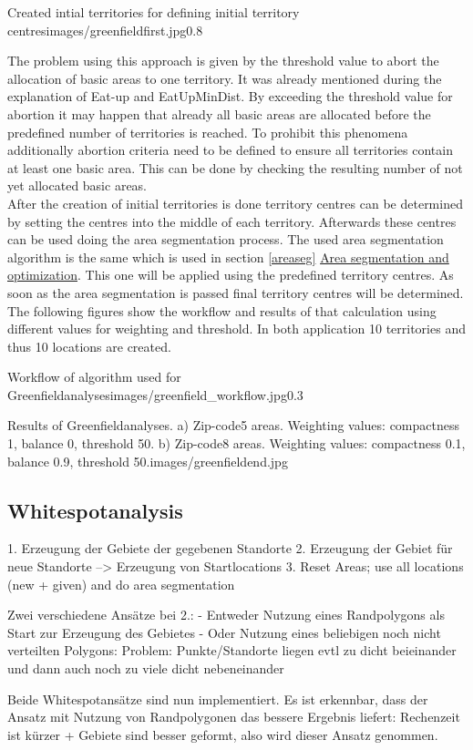\begin{figurevarSize}{Created intial territories for defining initial territory centres}{images/greenfieldfirst.jpg}{0.8}\end{figurevarSize}


The problem using this approach is given by the threshold value to abort the allocation of basic areas to one territory. It was already mentioned during the explanation of Eat-up and EatUpMinDist. By exceeding the threshold value for abortion it may happen that already all basic areas are allocated before the predefined number of territories is reached. To prohibit this phenomena additionally abortion criteria need to be defined to ensure all territories contain at least one basic area. This can be done by checking the resulting number of not yet allocated basic areas. \\
After the creation of initial territories is done territory centres can be determined by setting the centres into the middle of each territory. Afterwards these centres can be used doing the area segmentation process. The used area segmentation algorithm is the same which is used in section \ref{areaseg} \hyperref[areaseg]{Area segmentation and optimization}. This one will be applied using the predefined territory centres. As soon as the area segmentation is passed final territory centres will be determined. The following figures show the workflow and results of that calculation using different values for weighting and threshold. In both application 10 territories and thus 10 locations are created.


\begin{figurevarSize}{Workflow of algorithm used for Greenfieldanalyses}{images/greenfield_workflow.jpg}{0.3}\end{figurevarSize}

\begin{figureOwn}{Results of Greenfieldanalyses. a) Zip-code5 areas. Weighting values: compactness 1, balance 0, threshold 50. b) Zip-code8 areas. Weighting values: compactness 0.1, balance 0.9, threshold 50.}{images/greenfieldend.jpg}\end{figureOwn}

\subsection{Whitespotanalysis}

1.	Erzeugung der Gebiete der gegebenen Standorte
2.	Erzeugung der Gebiet für neue Standorte --> Erzeugung von Startlocations
3.	Reset Areas; use all locations (new + given) and do area segmentation

Zwei verschiedene Ansätze bei 2.:
-	Entweder Nutzung eines Randpolygons als Start zur Erzeugung des Gebietes
-	Oder Nutzung eines beliebigen noch nicht verteilten Polygons: Problem: Punkte/Standorte liegen evtl zu dicht beieinander und dann auch noch zu viele dicht nebeneinander

Beide Whitespotansätze sind nun implementiert. Es ist erkennbar, dass der Ansatz mit Nutzung von Randpolygonen das bessere Ergebnis liefert: Rechenzeit ist kürzer + Gebiete sind besser geformt, also wird dieser Ansatz genommen.
